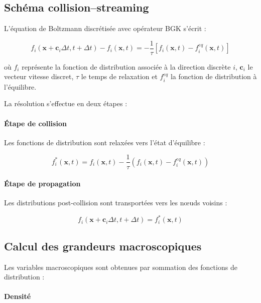 \documentclass[12pt,a4paper]{report}
\begin{document}
\subsection{Schéma collision--streaming}

L’équation de Boltzmann discrétisée avec opérateur BGK s’écrit :

\begin{equation}
f_i(\mathbf{x}+\mathbf{c}_i \Delta t,t+\Delta t)-f_i(\mathbf{x},t)
=
-\frac{1}{\tau}
\left[
f_i(\mathbf{x},t)-f_i^{eq}(\mathbf{x},t)
\right]
\end{equation}

où $f_i$ représente la fonction de distribution associée à la direction discrète $i$, $\mathbf{c}_i$ le vecteur vitesse discret, $\tau$ le temps de relaxation et $f_i^{eq}$ la fonction de distribution à l’équilibre.

La résolution s’effectue en deux étapes :

\paragraph{Étape de collision}

Les fonctions de distribution sont relaxées vers l’état d’équilibre :

\begin{equation}
f_i^{*}(\mathbf{x},t)
=
f_i(\mathbf{x},t)
-\frac{1}{\tau}
\left(
f_i(\mathbf{x},t)-f_i^{eq}(\mathbf{x},t)
\right)
\end{equation}

\paragraph{Étape de propagation}

Les distributions post-collision sont transportées vers les nœuds voisins :

\begin{equation}
f_i(\mathbf{x}+\mathbf{c}_i\Delta t,t+\Delta t)
=
f_i^{*}(\mathbf{x},t)
\end{equation}

\subsection{Calcul des grandeurs macroscopiques}

Les variables macroscopiques sont obtenues par sommation des fonctions de distribution :

\paragraph{Densité}
\end{document}
